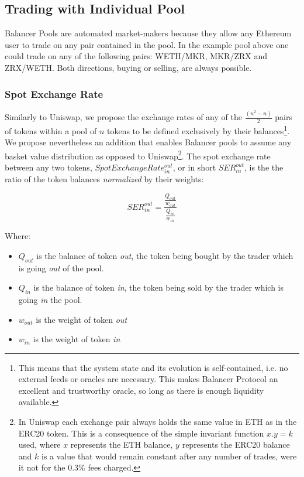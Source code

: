\documentclass[11pt]{amsart}
\begin{document}
\subsection{Trading with Individual Pool}
Balancer Pools are automated market-makers because they allow any Ethereum user to trade on any pair contained in the pool. In the example pool above one could trade on any of the following pairs: WETH/MKR, MKR/ZRX and ZRX/WETH. Both directions, buying or selling, are always possible.

\subsubsection{Spot Exchange Rate}
Similarly to Uniswap, we propose the exchange rates of any of the $\frac{(n^2 - n)}{2}$ pairs of tokens within a pool of $n$ tokens to be defined exclusively by their balances\footnote{This means that the system state and its evolution is self-contained, i.e. no external feeds or oracles are necessary. This makes Balancer Protocol an excellent and trustworthy oracle, so long as there is enough liquidity available.}. We propose nevertheless an addition that enables Balancer pools to assume any basket value distribution as opposed to Uniswap\footnote{In Uniswap each exchange pair always holds the same value in ETH as in the ERC20 token. This is a consequence of the simple invariant function $x.y=k$ used, where $x$ represents the ETH balance, $y$ represents the ERC20 balance and $k$ is a value that would remain constant after any number of trades, were it not for the 0.3\% fees charged.}. The spot exchange rate between any two tokens, $SpotExchangeRate^{out}_{in}$, or in short $SER^{out}_{in}$, is the the ratio of the token balances \textit{normalized} by their weights:

\begin{equation} 
\label{equation:SER}
SER^{out}_{in} = \frac{\frac{Q_{out}}{w_{out}}}{\frac{Q_{in}}{w_{in}}} 
\end{equation}

Where:
\begin{itemize}
    \item $Q_{out}$ is the balance of token \textit{out}, the token being bought by the trader which is going \textit{out} of the pool.
    \item $Q_{in}$ is the balance of token \textit{in}, the token being sold by the trader which is going \textit{in} the pool.
    \item $w_{out}$ is the weight of token \textit{out}
    \item $w_{in}$ is the weight of token \textit{in}

\end{itemize}
\end{document}
